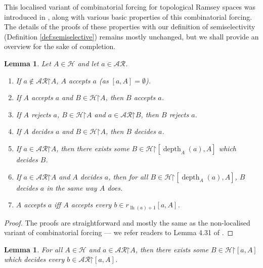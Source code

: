 \documentclass[11pt,reqno]{amsart}
\theoremstyle{plain}
\numberwithin{equation}{section}
\newtheorem{lemma}[theorem]{Lemma}
\theoremstyle{definition}
\newcommand{\func}{\operatorname}
\newcommand{\cal}{\mathcal}
\newcommand{\restrictedto}{\mathord{\upharpoonright}}
\renewcommand{\H}{\cal{H}}
\newcommand{\lh}{\func{lh}}
\newcommand{\depth}{\func{depth}}
\begin{document}
This localised variant of combinatorial forcing for topological Ramsey spaces was introduced in \cite{DMN15}, along with various basic properties of this combinatorial forcing. The details of the proofs of these properties with our definition of semiselectivity (Definition \ref{def:semiselective}) remains mostly unchanged, but we shall provide an overview for the sake of completion.

\begin{lemma}
\label{lem:combinatorial.forcing.basics}
    Let $A \in \H$ and let $a \in \cal{AR}$.
    \begin{enumerate}
        \item If $a \notin\cal{AR}\restrictedto A$, $A$ accepts $a$ (as $[a,A] = \emptyset$).
        
        \item If $A$ accepts $a$ and $B \in \H\restrictedto A$, then $B$ accepts $a$.
        
        \item If $A$ rejects $a$, $B \in \H\restrictedto A$ and $a \in \cal{AR}\restrictedto B$, then $B$ rejects $a$.
        
        \item If $A$ decides $a$ and $B \in \H\restrictedto A$, then $B$ decides $a$.
        
        \item If $a \in \cal{AR}\restrictedto A$, then there exists some $B \in \H\restrictedto[\depth_A(a),A]$ which decides $B$.
        
        \item If $a \in \cal{AR}\restrictedto A$ and $A$ decides $a$, then for all $B \in \H\restrictedto[\depth_A(a),A]$, $B$ decides $a$ in the same way $A$ does.
        
        \item $A$ accepts $a$ iff $A$ accepts every $b \in r_{\lh(a)+1}[a,A]$.
    \end{enumerate}
\end{lemma}

\begin{proof}
    The proofs are straightforward and mostly the same as the non-localised variant of combinatorial forcing --- we refer readers to Lemma 4.31 of \cite{T10}.
\end{proof}

\begin{lemma}
\label{lem:decisive.reduction}
    For all $A \in \H$ and $a \in \cal{AR}\restrictedto A$, then there exists some $B \in \H\restrictedto[a,A]$ which decides every $b \in \cal{AR}\restrictedto[a,A]$.
\end{lemma}
\end{document}
